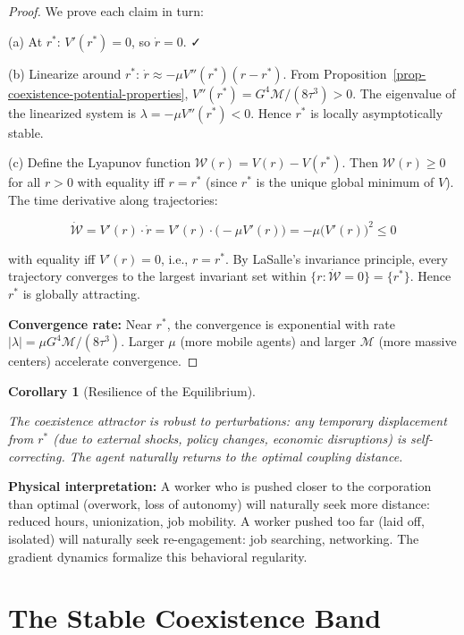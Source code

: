 \documentclass[11pt]{article}
\theoremstyle{plain}
\newtheorem{corollary}[theorem]{Corollary}
\theoremstyle{definition}
\theoremstyle{remark}
\let\origsection\section
\renewcommand{\section}{\needspace{12\baselineskip}\origsection}
\begin{document}
\begin{proof}
We prove each claim in turn:

(a) At $r^*$: $V'(r^*) = 0$, so $\dot{r} = 0$. ✓

(b) Linearize around $r^*$: $\dot{r} \approx -\mu V''(r^*)(r - r^*)$. From Proposition~\ref{prop-coexistence-potential-properties}, $V''(r^*) = G^4\mathcal{M}/(8\tau^3) > 0$. The eigenvalue of the linearized system is $\lambda = -\mu V''(r^*) < 0$. Hence $r^*$ is locally asymptotically stable.

(c) Define the Lyapunov function $\mathcal{W}(r) = V(r) - V(r^*)$. Then $\mathcal{W}(r) \geq 0$ for all $r > 0$ with equality iff $r = r^*$ (since $r^*$ is the unique global minimum of $V$). The time derivative along trajectories:

$$\dot{\mathcal{W}} = V'(r) \cdot \dot{r} = V'(r) \cdot \bigl(-\mu V'(r)\bigr) = -\mu \bigl(V'(r)\bigr)^2 \leq 0$$

with equality iff $V'(r) = 0$, i.e., $r = r^*$. By LaSalle's invariance principle, every trajectory converges to the largest invariant set within $\{r : \dot{\mathcal{W}} = 0\} = \{r^*\}$. Hence $r^*$ is globally attracting.

\textbf{Convergence rate:} Near $r^*$, the convergence is exponential with rate $|\lambda| = \mu G^4\mathcal{M}/(8\tau^3)$. Larger $\mu$ (more mobile agents) and larger $\mathcal{M}$ (more massive centers) accelerate convergence.
\end{proof}

\begin{corollary}[Resilience of the Equilibrium]
\label{cor-resilience-equilibrium}

The coexistence attractor is robust to perturbations: any temporary displacement from $r^*$ (due to external shocks, policy changes, economic disruptions) is self-correcting. The agent naturally returns to the optimal coupling distance.
\end{corollary}

\textbf{Physical interpretation:} A worker who is pushed closer to the
corporation than optimal (overwork, loss of autonomy) will naturally
seek more distance: reduced hours, unionization, job mobility. A worker
pushed too far (laid off, isolated) will naturally seek re-engagement:
job searching, networking. The gradient dynamics formalize this
behavioral regularity.

\section{The Stable Coexistence Band}\label{the-stable-coexistence-band}
\end{document}
